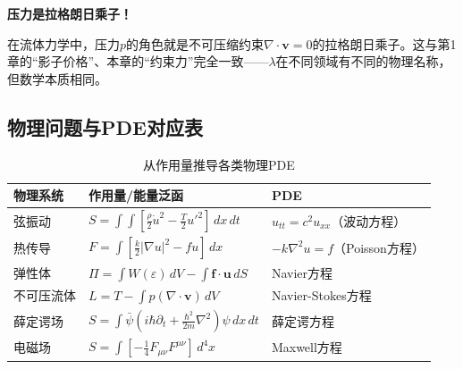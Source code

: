 \begin{insightbox}
\textbf{压力是拉格朗日乘子！}

在流体力学中，压力$p$的角色就是不可压缩约束$\nabla \cdot \mathbf{v} = 0$的拉格朗日乘子。这与第1章的“影子价格”、本章的“约束力”完全一致——$\lambda$在不同领域有不同的物理名称，但数学本质相同。
\end{insightbox}

\subsection*{物理问题与PDE对应表}

\begin{table}[htbp]
\centering
\renewcommand{\arraystretch}{1.4}
\begin{tabular}{l|l|l}
\toprule
\textbf{物理系统} & \textbf{作用量/能量泛函} & \textbf{PDE} \\
\midrule
弦振动 & $S = \int\!\!\int [\frac{\rho}{2}\dot{u}^2 - \frac{T}{2}u'^2]\,dx\,dt$ & $u_{tt} = c^2 u_{xx}$（波动方程）\\
热传导 & $F = \int [\frac{k}{2}|\nabla u|^2 - fu]\,dx$ & $-k\nabla^2 u = f$（Poisson方程）\\
弹性体 & $\Pi = \int W(\varepsilon)\,dV - \int \mathbf{f}\cdot\mathbf{u}\,dS$ & Navier方程 \\
不可压流体 & $L = T - \int p(\nabla\cdot\mathbf{v})\,dV$ & Navier-Stokes方程 \\
薛定谔场 & $S = \int \bar{\psi}(i\hbar\partial_t + \frac{\hbar^2}{2m}\nabla^2)\psi\,dx\,dt$ & 薛定谔方程 \\
电磁场 & $S = \int [-\frac{1}{4}F_{\mu\nu}F^{\mu\nu}]\,d^4x$ & Maxwell方程 \\
\bottomrule
\end{tabular}
\caption{从作用量推导各类物理PDE}
\end{table}


